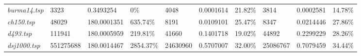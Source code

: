 \begin{landscape}
\begin{table}[]
\begin{tabular}{llllllllll}
  \textit{burma14.tsp}                                  & 3323                                   & 0.3493254                                                                            & 0\%                                                                                    & 4048                                   & 0.0001614                                                                             & 21.82\%                                                                                & 3814                                   & 0.0002581                                                                            & 14.78\%                                                                                \\
  \textit{ch150.tsp}                                    & 48029                                  & 180.0001351                                                                          & 635.74\%                                                                               & 8191                                   & 0.0109101                                                                             & 25.47\%                                                                                & 8347                                   & 0.0214446                                                                            & 27.86\%                                                                                \\
  \textit{d493.tsp}                                     & 111941                                 & 180.0005959                                                                          & 219.81\%                                                                               & 41660                                  & 0.1401718                                                                             & 19.02\%                                                                                & 44892                                  & 0.2299229                                                                            & 28.26\%                                                                                \\
  \textit{dsj1000.tsp}                                  & 551275688                              & 180.0014467                                                                          & 2854.37\%                                                                              & 24630960                               & 0.5707007                                                                             & 32.00\%                                                                                & 25086767                               & 0.7079459                                                                            & 34.44\%                                                                                \\

\end{tabular}
\end{table}
\end{landscape}
